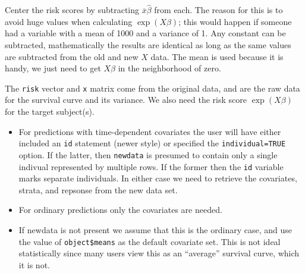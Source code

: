 \documentclass{article}
\newcommand{\code}[1]{\texttt{#1}}
\begin{document}
Center the risk scores by subtracting $ \overline x \hat\beta$ from each.
The reason for this is to avoid huge values when calculating $\exp(X\beta)$;
this would happen if someone had a variable with a mean of 1000 and a
variance of 1. 
Any constant can be subtracted, mathematically the results are identical as long
as the same values are subtracted from the old and new $X$ data.  
The mean is used because it is handy, we just need to get $X\beta$ in the
neighborhood of zero.


The \code{risk} vector and \code{x} matrix come from the original data, and are
the raw data for the survival curve and its variance.  
We also need the risk score $\exp(X\beta)$ for the target subject(s).
\begin{itemize}
  \item For predictions with time-dependent covariates the user will have 
    either included an \code{id} statement (newer style) or specified the
    \code{individual=TRUE} option.  If the latter, then \code{newdata} is
    presumed to contain only a single indivual represented by multiple
    rows.  If the former then the \code{id} variable marks separate individuals.
    In either case we need to retrieve
    the covariates, strata, and repsonse from the new data set.
  \item For ordinary predictions only the covariates are needed.
  \item If newdata is not present we assume that this is the ordinary case, and
    use the value of \code{object\$means} as the default covariate set.  This is
    not ideal statistically since many users view this as an
    ``average'' survival curve, which it is not.
\end{itemize}
\end{document}
